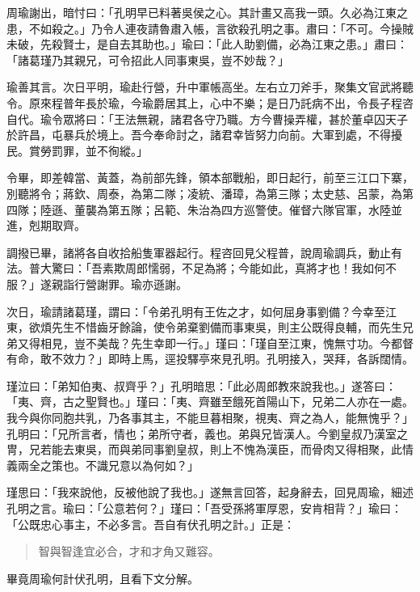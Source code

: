 周瑜謝出，暗忖曰：「孔明早已料著吳侯之心。其計畫又高我一頭。久必為江東之患，不如殺之。」乃令人連夜請魯肅入帳，言欲殺孔明之事。肅曰：「不可。今操賊未破，先殺賢士，是自去其助也。」瑜曰：「此人助劉備，必為江東之患。」肅曰：「諸葛瑾乃其親兄，可令招此人同事東吳，豈不妙哉？」

瑜善其言。次日平明，瑜赴行營，升中軍帳高坐。左右立刀斧手，聚集文官武將聽令。原來程普年長於瑜，今瑜爵居其上，心中不樂；是日乃託病不出，令長子程咨自代。瑜令眾將曰：「王法無親，諸君各守乃職。方今曹操弄權，甚於董卓囚天子於許昌，屯暴兵於境上。吾今奉命討之，諸君幸皆努力向前。大軍到處，不得擾民。賞勞罰罪，並不徇縱。」

令畢，即差韓當、黃蓋，為前部先鋒，領本部戰船，即日起行，前至三江口下寨，別聽將令；蔣欽、周泰，為第二隊；凌統、潘璋，為第三隊；太史慈、呂蒙，為第四隊；陸遜、董襲為第五隊；呂範、朱治為四方巡警使。催督六隊官軍，水陸並進，剋期取齊。

調撥已畢，諸將各自收拾船隻軍器起行。程咨回見父程普，說周瑜調兵，動止有法。普大驚曰：「吾素欺周郎懦弱，不足為將；今能如此，真將才也！我如何不服？」遂親詣行營謝罪。瑜亦遜謝。

次日，瑜請諸葛瑾，謂曰：「令弟孔明有王佐之才，如何屈身事劉備？今幸至江東，欲煩先生不惜齒牙餘論，使令弟棄劉備而事東吳，則主公既得良輔，而先生兄弟又得相見，豈不美哉？先生幸即一行。」瑾曰：「瑾自至江東，愧無寸功。今都督有命，敢不效力？」即時上馬，逕投驛亭來見孔明。孔明接入，哭拜，各訴闊情。

瑾泣曰：「弟知伯夷、叔齊乎？」孔明暗思：「此必周郎教來說我也。」遂答曰：「夷、齊，古之聖賢也。」瑾曰：「夷、齊雖至餓死首陽山下，兄弟二人亦在一處。我今與你同胞共乳，乃各事其主，不能旦暮相聚，視夷、齊之為人，能無愧乎？」孔明曰：「兄所言者，情也；弟所守者，義也。弟與兄皆漢人。今劉皇叔乃漢室之冑，兄若能去東吳，而與弟同事劉皇叔，則上不愧為漢臣，而骨肉又得相聚，此情義兩全之策也。不識兄意以為何如？」

瑾思曰：「我來說他，反被他說了我也。」遂無言回答，起身辭去，回見周瑜，細述孔明之言。瑜曰：「公意若何？」瑾曰：「吾受孫將軍厚恩，安肯相背？」瑜曰：「公既忠心事主，不必多言。吾自有伏孔明之計。」正是：

\begin{quote}
智與智逢宜必合，才和才角又難容。
\end{quote}

畢竟周瑜何計伏孔明，且看下文分解。
